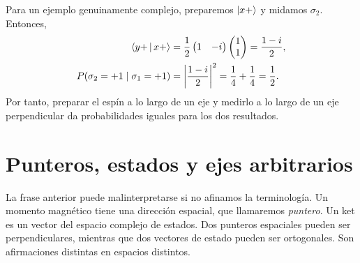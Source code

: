 Para un ejemplo genuinamente complejo, preparemos \(\left\lvert x+\right\rangle\) y midamos \(\sigma_2\). Entonces,
\begin{align}
  \left\langle y+\,\middle|\,x+\right\rangle
  &=
  \frac12
  \begin{pmatrix}1&-i\end{pmatrix}
  \begin{pmatrix}1\\1\end{pmatrix}
  =\frac{1-i}{2},
  \notag\\
  P(\sigma_2=+1\mid\sigma_1=+1)
  &=\left|\frac{1-i}{2}\right|^2
  =\frac14+\frac14
  =\frac12.
  \label{eq:l03-complex-probability-example}
\end{align}
Por tanto, preparar el espín a lo largo de un eje y medirlo a lo largo de un eje perpendicular da probabilidades iguales para los dos resultados.

\section{Punteros, estados y ejes arbitrarios}

La frase anterior puede malinterpretarse si no afinamos la terminología. Un momento magnético tiene una dirección espacial, que llamaremos \emph{puntero}. Un ket es un vector del espacio complejo de estados. Dos punteros espaciales pueden ser perpendiculares, mientras que dos vectores de estado pueden ser ortogonales. Son afirmaciones distintas en espacios distintos.

\begin{classroomqa}
\end{classroomqa}

\begin{classroomqa}
\end{classroomqa}

